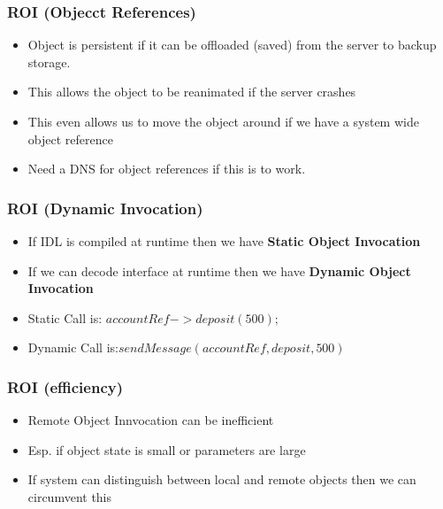 \documentclass{beamer}
\begin{document}
            \begin{frame}
            	\frametitle{ROI (Objecct References)}
            	\begin{itemize}
            		\item Object is persistent if it can be offloaded (saved) from the server to backup storage. 
            		\item This allows the object to be reanimated if the server crashes
            		\item This even allows us to move the object around if we have a system wide object reference
            		\item Need a DNS for object references if this is to work.
            	\end{itemize}
            \end{frame}
      \begin{frame}
      	\frametitle{ROI (Dynamic Invocation)}
      	\begin{itemize}
      		\item If IDL is compiled at runtime then we have\textbf{ Static Object Invocation}
      		\item If we can decode interface at runtime then we have \textbf{Dynamic Object Invocation}
      		\item Static Call is:  $accountRef->deposit(500);$
      		\item Dynamic Call is:$sendMessage(accountRef,deposit,500)$
      	\end{itemize}
      \end{frame}      
      \begin{frame}
      	\frametitle{ROI (efficiency)}
      	\begin{itemize}
      		\item Remote Object Innvocation can be inefficient
      		\item Esp. if object state is small or parameters are large
      		\item If system can distinguish between local and remote objects then we can circumvent this
      	\end{itemize}
      \end{frame}  
\end{document}
